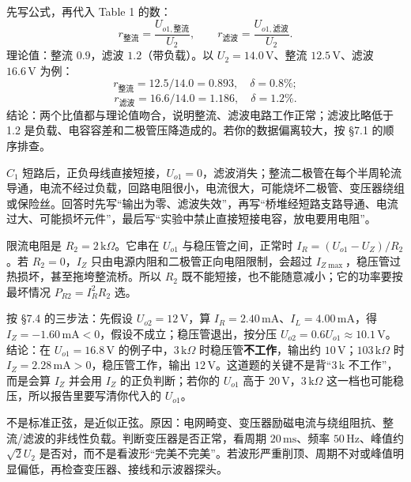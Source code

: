 \documentclass[11pt]{ctexart}
\let\orighdr\hdr
\renewcommand{\hdr}[2]{\needspace{12\baselineskip}\orighdr{#1}{#2}}
\let\origsubhdr\subhdr
\renewcommand{\subhdr}[1]{\needspace{3\baselineskip}\origsubhdr{#1}}
\begin{document}


先写公式，再代入 Table 1 的数：
\[
r_{\text{整流}}=\frac{U_{o1,\text{整流}}}{U_2},\qquad
r_{\text{滤波}}=\frac{U_{o1,\text{滤波}}}{U_2}.
\]
理论值：整流 $0.9$，滤波 $1.2$（带负载）。以 $U_2=14.0\,\mathrm{V}$、整流 $12.5\,\mathrm{V}$、滤波 $16.6\,\mathrm{V}$ 为例：
\[
r_{\text{整流}}=12.5/14.0=0.893,\quad \delta=0.8\%;
\]
\[
r_{\text{滤波}}=16.6/14.0=1.186,\quad \delta=1.2\%.
\]
结论：两个比值都与理论值吻合，说明整流、滤波电路工作正常；滤波比略低于 1.2 是负载、电容容差和二极管压降造成的。若你的数据偏离较大，按 §7.1 的顺序排查。


$C_1$ 短路后，正负母线直接短接，$U_{o1}=0$，滤波消失；整流二极管在每个半周轮流导通，电流不经过负载，回路电阻很小，电流很大，可能烧坏二极管、变压器绕组或保险丝。回答时先写“输出为零、滤波失效”，再写“桥堆经短路支路导通、电流过大、可能损坏元件”，最后写“实验中禁止直接短接电容，放电要用电阻”。


限流电阻是 $R_2=2\,\mathrm{k}\Omega$。它串在 $U_{o1}$ 与稳压管之间，正常时 $I_R=(U_{o1}-U_Z)/R_2$。若 $R_2=0$，$I_Z$ 只由电源内阻和二极管正向电阻限制，会超过 $I_{Z\max}$，稳压管过热损坏，甚至拖垮整流桥。所以 $R_2$ 既不能短接，也不能随意减小；它的功率要按最坏情况 $P_{R2}=I_R^2R_2$ 选。


按 §7.4 的三步法：先假设 $U_{o2}=12\,\mathrm{V}$，算 $I_R=2.40\,\mathrm{mA}$、$I_L=4.00\,\mathrm{mA}$，得 $I_Z=-1.60\,\mathrm{mA}<0$，假设不成立；稳压管退出，按分压 $U_{o2}=0.6U_{o1}\approx10.1\,\mathrm{V}$。结论：在 $U_{o1}=16.8\,\mathrm{V}$ 的例子中，$3\,\mathrm{k}\Omega$ 时稳压管\textbf{不工作}，输出约 $10\,\mathrm{V}$；$103\,\mathrm{k}\Omega$ 时 $I_Z=2.28\,\mathrm{mA}>0$，稳压管工作，输出 $12\,\mathrm{V}$。这道题的关键不是背“3\,k 不工作”，而是会算 $I_Z$ 并会用 $I_Z$ 的正负判断；若你的 $U_{o1}$ 高于 $20\,\mathrm{V}$，$3\,\mathrm{k}\Omega$ 这一档也可能稳压，所以报告里要写清你代入的 $U_{o1}$。


不是标准正弦，是近似正弦。原因：电网畸变、变压器励磁电流与绕组阻抗、整流/滤波的非线性负载。判断变压器是否正常，看周期 $20\,\mathrm{ms}$、频率 $50\,\mathrm{Hz}$、峰值约 $\sqrt2U_2$ 是否对，而不是看波形“完美不完美”。若波形严重削顶、周期不对或峰值明显偏低，再检查变压器、接线和示波器探头。
\end{document}
